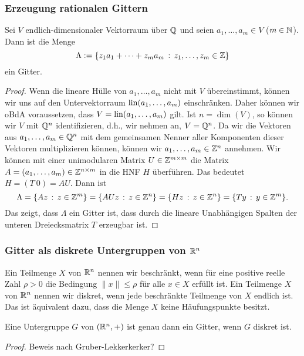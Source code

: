 	\subsubsection{Erzeugung rationalen Gittern} 
	
	\begin{thm}
		Sei $V$ endlich-dimensionaler Vektorraum über $\mathbb Q$ und seien $a_1,\ldots,a_m \in V$ ($m \in \mathbb N$). Dann ist die Menge
		\[
		\Lambda := \{ z_1 a_1 + \cdots + z_m a_m \,:\, z_1,\ldots,z_m \in \mathbb Z \} 
		\]
		ein Gitter. 
	\end{thm} 
	\begin{proof} 
		Wenn die lineare Hülle von $a_1,\ldots,a_m$ nicht mit $V$ übereinstimmt, können wir uns auf den Untervektorraum $\operatorname{lin}(a_1,\ldots,a_m)$ einschränken. Daher können wir oBdA voraussetzen, dass $V =\operatorname{lin}(a_1,\ldots,a_m)$ gilt. Ist $n=\dim(V)$, so können wir $V$ mit $\mathbb Q^n$ identifizieren, d.h., wir nehmen an, $V = \mathbb Q^n$. Da wir die Vektoren aus $a_1,\ldots,a_m \in \mathbb Q^n$ mit dem gemeinsamen Nenner aller Komponenten dieser Vektoren multiplizieren können, können wir $a_1,\ldots,a_m \in \mathbb Z^n$ annehmen. Wir können mit einer unimodularen Matrix $U \in \mathbb Z^{m \times m}$ die Matrix $A = (a_1,\ldots,a_m) \in \mathbb Z^{n \times m}$ in die HNF $H$ überführen. Das bedeutet $H= (T \ 0) = A U$. Dann ist 
		\[
		\Lambda = \{ A z \,:\, z \in \mathbb Z^m \} = \{ A U z \,:\, z \in \mathbb Z^n \}  = \{ H z \,:\, z \in \mathbb Z^n \} = \{ T y \,:\, y \in \mathbb Z^m \}.
		\]
		Das zeigt, dass $\Lambda$ ein Gitter ist, dass durch die lineare Unabhängigen Spalten der unteren Dreiecksmatrix $T$ erzeugbar ist. 
	\end{proof} 
	
	
	\subsubsection{Gitter als diskrete Untergruppen von $\mathbb R^n$} 
	
	Ein Teilmenge $X$ von $\mathbb R^n$ nennen wir beschränkt, wenn für eine positive reelle Zahl $\rho>0$ die Bedingung $\|x\| \le \rho$ für alle $x \in X$ erfüllt ist. 
	Ein Teilmenge $X$ von $\mathbb R^n$ nennen wir diskret, wenn jede beschränkte Teilmenge von $X$ endlich ist. Das ist äquivalent dazu, dass die Menge $X$ keine Häufungspunkte besitzt. 
	
	\begin{thm}
		Eine Untergruppe $G$ von $(\mathbb R^n,+)$ ist genau dann ein Gitter, wenn $G$ diskret ist. 
	\end{thm} 
	\begin{proof}
		Beweis nach Gruber-Lekkerkerker?
	\end{proof} 
	
